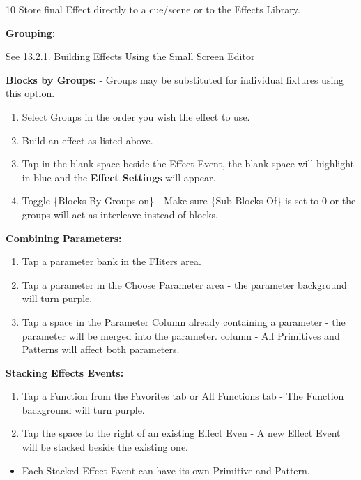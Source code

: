 \documentclass[
]{article}
\providecommand{\tightlist}{%
  \setlength{\itemsep}{0pt}\setlength{\parskip}{0pt}}
\begin{document}
10 Store final Effect directly to a cue/scene or to the Effects Library.

\textbf{Grouping:}

See \href{https://vibemanual.compulite.com/effects-1.html\#building-effects-using-the-small-screen-editor}{13.2.1. Building Effects Using the Small Screen Editor}

\textbf{Blocks by Groups:} - Groups may be substituted for individual fixtures using this option.

\begin{enumerate}
\def\labelenumi{\arabic{enumi}.}
\item
  Select Groups in the order you wish the effect to use.
\item
  Build an effect as listed above.
\item
  Tap in the blank space beside the Effect Event, the blank space will highlight in blue and the \textbf{Effect Settings} will appear.
\item
  Toggle \{Blocks By Groups on\} - Make sure \{Sub Blocks Of\} is set to 0 or the groups will act as interleave instead of blocks.
\end{enumerate}

\textbf{Combining Parameters:}

\begin{enumerate}
\def\labelenumi{\arabic{enumi}.}
\item
  Tap a parameter bank in the FIiters area.
\item
  Tap a parameter in the Choose Parameter area - the parameter background will turn purple.
\item
  Tap a space in the Parameter Column already containing a parameter - the parameter will be merged into the parameter. column - All Primitives and Patterns will affect both parameters.
\end{enumerate}

\textbf{Stacking Effects Events:}

\begin{enumerate}
\def\labelenumi{\arabic{enumi}.}
\item
  Tap a Function from the Favorites tab or All Functions tab - The Function background will turn purple.
\item
  Tap the space to the right of an existing Effect Even - A new Effect Event will be stacked beside the existing one.
\end{enumerate}

\begin{itemize}
\tightlist
\item
  Each Stacked Effect Event can have its own Primitive and Pattern.
\end{itemize}
\end{document}
